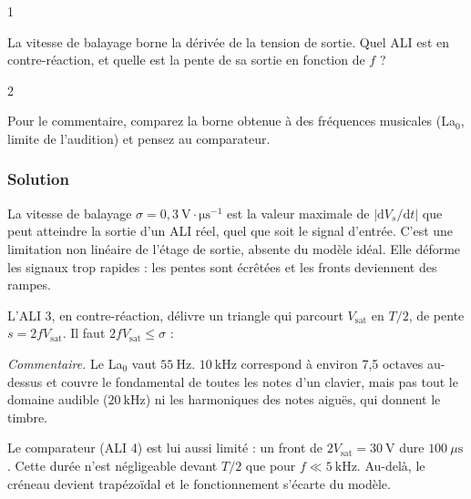 \documentclass[11pt,a4paper]{article}
\newcommand{\equationajustee}[1]{%
  \sbox{\boiteequation}{$\displaystyle #1$}%
  \ifdim\wd\boiteequation>\linewidth
    \[\resizebox{\linewidth}{!}{\usebox{\boiteequation}}\]%
  \else
    \[#1\]%
  \fi}
\begin{document}
\begin{indication}{1}

La vitesse de balayage borne la dérivée de la tension de sortie. Quel ALI est en contre-réaction, et quelle est la pente de sa sortie en fonction de \(f\) ?

\end{indication}

\begin{indication}{2}

Pour le commentaire, comparez la borne obtenue à des fréquences musicales (La\(_0\), limite de l'audition) et pensez au comparateur.

\end{indication}

\hypertarget{solution-19}{%
\subsubsection{Solution}\label{solution-19}}

La vitesse de balayage \(\sigma=0{,}3\ \mathrm{V\cdot\mu s^{-1}}\) est la valeur maximale de \(|\mathrm{d}V_s/\mathrm{d}t|\) que peut atteindre la sortie d'un ALI réel, quel que soit le signal d'entrée. C'est une limitation non linéaire de l'étage de sortie, absente du modèle idéal. Elle déforme les signaux trop rapides : les pentes sont écrêtées et les fronts deviennent des rampes.

L'ALI 3, en contre-réaction, délivre un triangle qui parcourt \(V_{\mathrm{sat}}\) en \(T/2\), de pente \(s=2fV_{\mathrm{sat}}\). Il faut \(2fV_{\mathrm{sat}}\leqslant\sigma\) :

\equationajustee{\begin{aligned}
f&\leqslant\frac{\sigma}{2V_{\mathrm{sat}}}\\
&=\frac{0{,}3\times10^6}{2\times15}\\
&=\boxed{1{,}0\times10^4\ \mathrm{Hz}}
\end{aligned}}

\emph{Commentaire.} Le La\(_0\) vaut \(55\ \mathrm{Hz}\). \(10\ \mathrm{kHz}\) correspond à environ 7,5 octaves au-dessus et couvre le fondamental de toutes les notes d'un clavier, mais pas tout le domaine audible (\(20\ \mathrm{kHz}\)) ni les harmoniques des notes aiguës, qui donnent le timbre.

Le comparateur (ALI 4) est lui aussi limité : un front de \(2V_{\mathrm{sat}}=30\ \mathrm{V}\) dure \(100\ \mu\mathrm{s}\). Cette durée n'est négligeable devant \(T/2\) que pour \(f\ll5\ \mathrm{kHz}\). Au-delà, le créneau devient trapézoïdal et le fonctionnement s'écarte du modèle.
\end{document}
